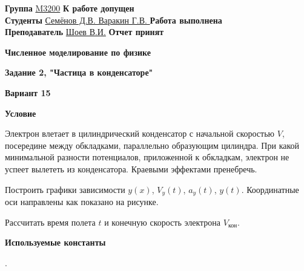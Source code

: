 \documentclass[12pt]{article}
\begin{document}
    \vspace*{2\baselineskip}

    \thispagestyle{fancy}

    \noindent
    \textbf{Группа} \underline{M3200\hspace{3.85cm}} \hfill \textbf{К работе допущен} \underline{\hspace{4cm}} \\[0.5cm]
    \textbf{Студенты} \underline{Семёнов Д.В. Варакин Г.В. \hspace{0.35cm}} \hfill \textbf{Работа выполнена} \underline{\hspace{4cm}} \\[0.5cm]
    \textbf{Преподаватель} \underline{Шоев В.И.\hspace{0.85cm}} \hfill \textbf{Отчет принят} \underline{\hspace{4.85cm}} \\


    \begin{center}
        {\huge \textbf{Численное моделирование по физике}}

        \smallvspace

        {\Large \textbf{Задание 2, "Частица в конденсаторе"}}

        \smallvspace

        {\Large \textbf{Вариант 15}}
    \end{center}

   \begin{flushleft}
       {\Large \textbf{Условие}}
   \end{flushleft}

    Электрон влетает в цилиндрический конденсатор с начальной скоростью $V$, посередине между обкладками, параллельно образующим цилиндра. При какой минимальной разности потенциалов, приложенной к обкладкам, электрон не успеет вылететь из конденсатора. Краевыми эффектами пренебречь.
    
    Построить графики зависимости $y(x)$, $V_y(t)$, $a_y(t)$, $y(t)$. Координатные оси направлены как показано на рисунке.
    
    Рассчитать время полета $t$ и конечную скорость электрона $V_{\text{кон}}$.


    
    \begin{flushleft}
        {\large \textbf{Используемые константы}}
    \end{flushleft}

    . 
    \smallvspace
    
\end{document}
